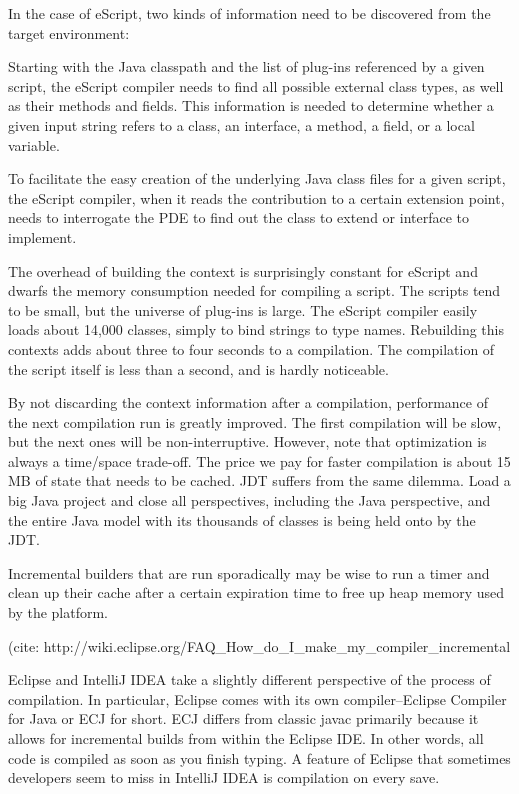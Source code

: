 In the case of eScript, two kinds of information need to be discovered from the target environment:

    Starting with the Java classpath and the list of plug-ins referenced by a given script, the eScript compiler needs to find all possible external class types, as well as their methods and fields. This information is needed to determine whether a given input string refers to a class, an interface, a method, a field, or a local variable. 

    To facilitate the easy creation of the underlying Java class files for a given script, the eScript compiler, when it reads the contribution to a certain extension point, needs to interrogate the PDE to find out the class to extend or interface to implement. 


The overhead of building the context is surprisingly constant for eScript and dwarfs the memory consumption needed for compiling a script. The scripts tend to be small, but the universe of plug-ins is large. The eScript compiler easily loads about 14,000 classes, simply to bind strings to type names. Rebuilding this contexts adds about three to four seconds to a compilation. The compilation of the script itself is less than a second, and is hardly noticeable.

By not discarding the context information after a compilation, performance of the next compilation run is greatly improved. The first compilation will be slow, but the next ones will be non-interruptive. However, note that optimization is always a time/space trade-off. The price we pay for faster compilation is about 15 MB of state that needs to be cached. JDT suffers from the same dilemma. Load a big Java project and close all perspectives, including the Java perspective, and the entire Java model with its thousands of classes is being held onto by the JDT.

Incremental builders that are run sporadically may be wise to run a timer and clean up their cache after a certain expiration time to free up heap memory used by the platform. 

(cite: http://wiki.eclipse.org/FAQ_How_do_I_make_my_compiler_incremental%

Eclipse and IntelliJ IDEA take a slightly different perspective of the process of compilation. In particular, Eclipse comes with its own compiler--Eclipse Compiler for Java or ECJ for short. ECJ differs from classic javac primarily because it allows for incremental builds from within the Eclipse IDE. In other words, all code is compiled as soon as you finish typing.
A feature of Eclipse that sometimes developers seem to miss in IntelliJ IDEA is compilation on every save. 

